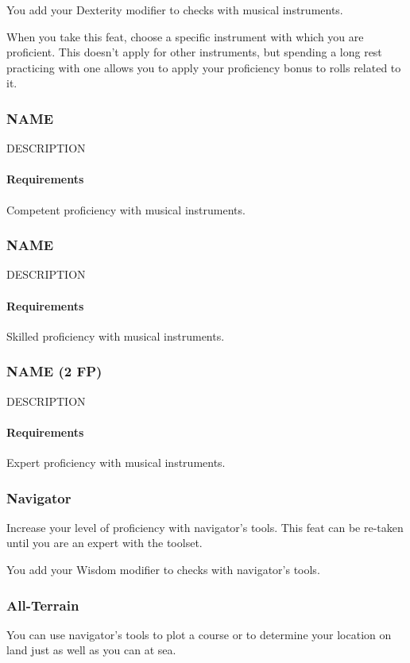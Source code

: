     You add your Dexterity modifier to checks with musical instruments.

    When you take this feat, choose a specific instrument with which you are proficient.
    This doesn't apply for other instruments, but spending a long rest practicing with one allows you to apply your proficiency bonus to rolls related to it.
\subsubsection{NAME} \label{feat::name}
    DESCRIPTION
    \paragraph{Requirements} Competent proficiency with musical instruments.
\subsubsection{NAME} \label{feat::name}
    DESCRIPTION
    \paragraph{Requirements} Skilled proficiency with musical instruments.
\subsubsection{NAME (2 FP)} \label{feat::name}
    DESCRIPTION
    \paragraph{Requirements} Expert proficiency with musical instruments.

\subsubsection{Navigator} \label{feat::navigator}
    Increase your level of proficiency with navigator's tools.
    This feat can be re-taken until you are an expert with the toolset.

    You add your Wisdom modifier to checks with navigator's tools.
\subsubsection{All-Terrain} \label{feat::allterrain}
    You can use navigator's tools to plot a course or to determine your location on land just as well as you can at sea.
